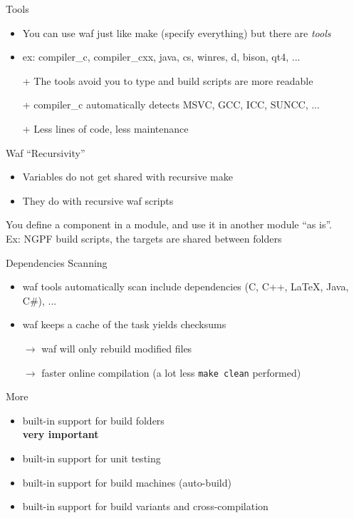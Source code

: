 \documentclass[xetex]{beamer}
\begin{document}
\begin{frame}{Tools}
	\begin{itemize}
		\item You can use waf just like make (specify everything) but there are \textit{tools}
		\item ex: compiler\_c, compiler\_cxx, java, cs, winres, d, bison, qt4, ...
		\item[+] The tools avoid you to type and build scripts are more readable
		\item[+] compiler\_c automatically detects MSVC, GCC, ICC, SUNCC, ...
		\item[+] Less lines of code, less maintenance
	\end{itemize}
\end{frame}

\begin{frame}{Waf “Recursivity”}
	\begin{itemize}
		\item Variables do not get shared with recursive make
		\item They do with recursive waf scripts
	\end{itemize}

	You define a component in a module, and use it in another module “as is”.
	\\
	Ex: NGPF build scripts, the targets are shared between folders

\end{frame}


\begin{frame}{Dependencies Scanning}
	\begin{itemize}
		\item waf tools automatically scan include dependencies (C, C++, LaTeX, Java, C\#), ...
		\item waf keeps a cache of the task yields checksums
		\item[$\to$] waf will only rebuild modified files
		\item[$\to$] faster online compilation (a lot less \texttt{make clean} performed)
	\end{itemize}
\end{frame}


\begin{frame}{More}
	\begin{itemize}
		\item built-in support for build folders\\
		\textbf{very important}
		\item built-in support for unit testing
		\item built-in support for build machines (auto-build)
		\item built-in support for build variants and cross-compilation
	\end{itemize}
\end{frame}
\end{document}
